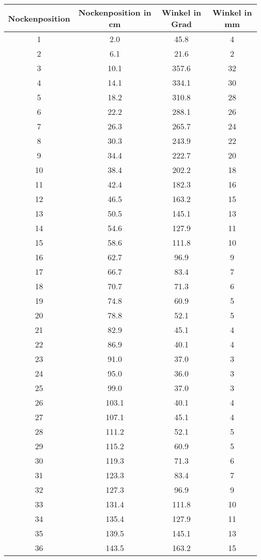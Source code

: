 \documentclass[10pt, a4paper]{article}
\begin{document}
\begin{center}
	\begin{tabular}{c|c|c|c}
		Nockenposition & Nockenposition in cm & Winkel in Grad & Winkel in mm \\
		\hline
		1 & 2.0 & 45.8 & 4 \\
		2 & 6.1 & 21.6 & 2 \\
		3 & 10.1 & 357.6 & 32 \\
		4 & 14.1 & 334.1 & 30 \\
		5 & 18.2 & 310.8 & 28 \\
		6 & 22.2 & 288.1 & 26 \\
		7 & 26.3 & 265.7 & 24 \\
		8 & 30.3 & 243.9 & 22 \\
		9 & 34.4 & 222.7 & 20 \\
		10 & 38.4 & 202.2 & 18 \\
		11 & 42.4 & 182.3 & 16 \\
		12 & 46.5 & 163.2 & 15 \\
		13 & 50.5 & 145.1 & 13 \\
		14 & 54.6 & 127.9 & 11 \\
		15 & 58.6 & 111.8 & 10 \\
		16 & 62.7 & 96.9 & 9 \\
		17 & 66.7 & 83.4 & 7 \\
		18 & 70.7 & 71.3 & 6 \\
		19 & 74.8 & 60.9 & 5 \\
		20 & 78.8 & 52.1 & 5 \\
		21 & 82.9 & 45.1 & 4 \\
		22 & 86.9 & 40.1 & 4 \\
		23 & 91.0 & 37.0 & 3 \\
		24 & 95.0 & 36.0 & 3 \\
		25 & 99.0 & 37.0 & 3 \\
		26 & 103.1 & 40.1 & 4 \\
		27 & 107.1 & 45.1 & 4 \\
		28 & 111.2 & 52.1 & 5 \\
		29 & 115.2 & 60.9 & 5 \\
		30 & 119.3 & 71.3 & 6 \\
		31 & 123.3 & 83.4 & 7 \\
		32 & 127.3 & 96.9 & 9 \\
		33 & 131.4 & 111.8 & 10 \\
		34 & 135.4 & 127.9 & 11 \\
		35 & 139.5 & 145.1 & 13 \\
		36 & 143.5 & 163.2 & 15 \\

\end{tabular}
\end{center}
\end{document}
